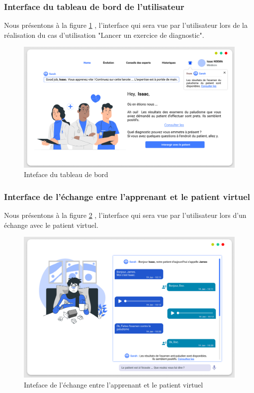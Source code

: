\subsubsection{Interface du tableau de bord  de l'utilisateur}
Nous présentons à la figure \ref{fig:dashboard} , l'interface qui sera vue par l'utilisateur lors de la réalisation du cas d'utilisation "Lancer un exercice de diagnostic".
\begin{figure}[H]
    \centering
    \includegraphics[width=\textwidth]{figures/dashboard.png}
        \captionsetup{justification=centering}
    \caption{Inteface du tableau de bord}
    \label{fig:dashboard}
\end{figure}

\subsubsection{Interface de l'échange entre l'apprenant et le patient virtuel}
Nous présentons à la figure \ref{fig:echange} , l'interface qui sera vue par l'utilisateur lors d'un échange avec le patient virtuel.
\begin{figure}[H]
    \centering
    \includegraphics[width=\textwidth]{figures/patient-apprenant.png}
        \captionsetup{justification=centering}
    \caption{Inteface de l'échange entre l'apprenant et le patient virtuel}
    \label{fig:echange}
\end{figure}





